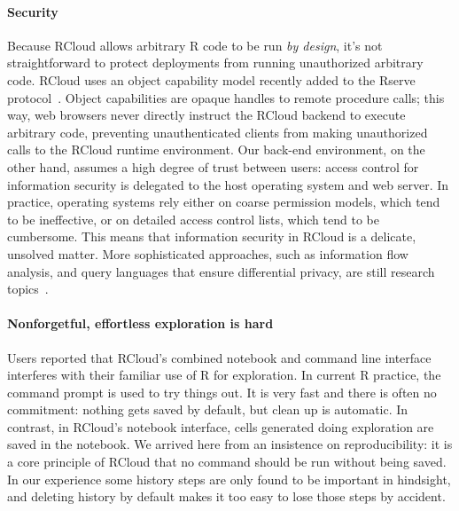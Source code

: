 \paragraph*{Security}
Because RCloud allows arbitrary R code to be run
\emph{by design}, it's not straightforward to protect deployments
from running unauthorized arbitrary code. RCloud uses an object capability model
\cite{Miller:2006:RCT} recently added to the Rserve
protocol~\cite{Urbanek:2003:AFW}. Object capabilities are opaque handles
to remote procedure calls; this way, web browsers never directly instruct the
RCloud backend to execute arbitrary code, preventing unauthenticated clients
from making unauthorized calls to the RCloud runtime environment.
%
Our back-end environment, on the other hand, assumes a high degree of trust between users:
access control for information security is delegated to the host
operating system and web server. In practice, operating
systems rely either on coarse permission models,
which tend to be ineffective, or on detailed access control
lists, which tend to be cumbersome. This means that information security
in RCloud is a delicate, unsolved matter. More
sophisticated approaches, such as information flow analysis,
and query languages that ensure differential privacy, are
still research topics~\cite{Moore:2011:SAF}.

\paragraph*{Nonforgetful, effortless exploration is hard}
Users reported that RCloud's combined notebook and command line
interface interferes with their familiar use of R for exploration. In
current R practice, the command prompt is used to try things out. It
is very fast and there is often no commitment: nothing gets saved by
default, but clean up is automatic. In contrast, in RCloud's
notebook interface, cells generated doing exploration are saved in the
notebook. We arrived here from an insistence on reproducibility: it is a
core principle of RCloud that no command should be run without being
saved. In our experience some history steps are only found to be
important in hindsight, and deleting history by default makes it too
easy to lose those steps by accident.

